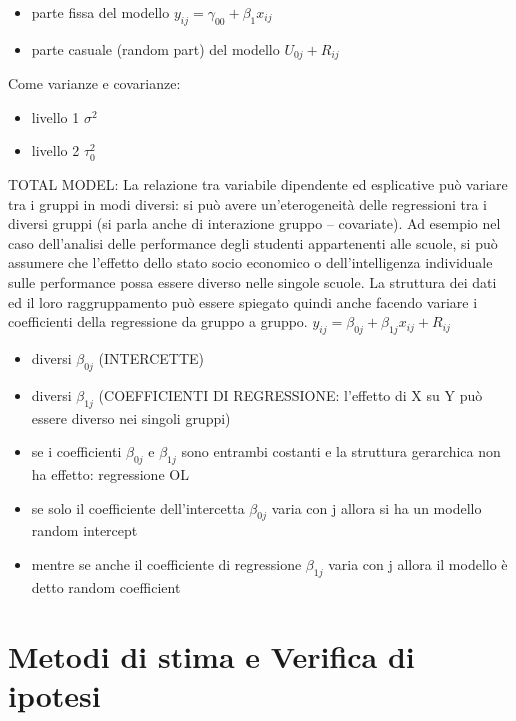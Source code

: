 \documentclass[a4page, 11pt]{article}
\begin{document}
\begin{itemize}
\item parte fissa del modello $y_{ij}=\gamma_{00}+\beta_1 x_{ij}$
\item parte casuale (random part) del modello $U_{0j}+ R_{ij}$
\end{itemize}
Come varianze e covarianze:
\begin{itemize}
\item livello 1 $\sigma^{2}$
\item livello 2 $\tau^{2}_0$
\newline
\end{itemize}
TOTAL MODEL: 
\newline
La relazione tra variabile dipendente ed esplicative può variare tra i gruppi in modi diversi: si può avere un’eterogeneità delle regressioni tra i diversi gruppi (si parla anche di interazione gruppo – covariate). Ad esempio nel caso dell’analisi delle performance degli studenti appartenenti alle scuole, si può assumere che l’effetto dello stato socio economico o dell’intelligenza individuale sulle performance possa essere diverso nelle singole scuole.
\newline
La struttura dei dati ed il loro raggruppamento può essere spiegato quindi anche facendo variare i coefficienti della regressione da gruppo a gruppo.
\newline
$y_{ij}=\beta_{0j}+\beta_{1j} x_{ij}+ R_{ij}$
\begin{itemize}
\item diversi $\beta_{0j}$ (INTERCETTE)
\item diversi $\beta_{1j}$ (COEFFICIENTI DI REGRESSIONE: l’effetto di X su Y può essere diverso nei singoli gruppi)
\item se i coefficienti $\beta_{0j}$ e $\beta_{1j}$ sono entrambi costanti e la struttura gerarchica non ha effetto: regressione OL
\item se solo il coefficiente dell’intercetta $\beta_{0j}$ varia con j allora si ha un modello random intercept
\item mentre se anche il coefficiente di regressione $\beta_{1j}$ varia con j allora il modello è detto random coefficient
\end{itemize}

\section{Metodi di stima e Verifica di ipotesi}
\end{document}
